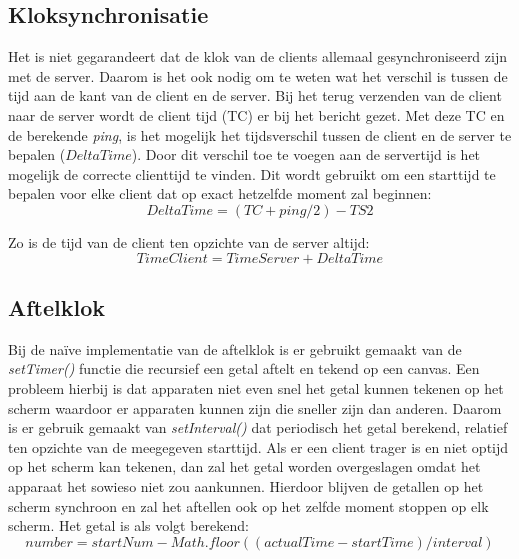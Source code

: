\subsection{Kloksynchronisatie}
Het is niet gegarandeert dat de klok van de clients allemaal gesynchroniseerd zijn met de server. Daarom is het ook nodig om te weten wat het verschil is tussen de tijd aan de kant van de client en de server.
Bij het terug verzenden van de client naar de server wordt de client tijd (TC) er bij het bericht gezet. Met deze TC en de berekende {\it ping}, is het mogelijk het tijdsverschil tussen de client en de server te bepalen ($DeltaTime$). Door dit verschil toe te voegen aan de servertijd is het mogelijk de correcte clienttijd te vinden. Dit wordt gebruikt om een starttijd te bepalen voor elke client dat op exact hetzelfde moment zal beginnen:
\[DeltaTime = (TC+ping/2) - TS2\]

Zo is de tijd van de client ten opzichte van de server altijd:
\[TimeClient = TimeServer + DeltaTime\]


\subsection{Aftelklok}
Bij de naïve implementatie van de aftelklok is er gebruikt gemaakt van de {\it setTimer()} functie die recursief een getal aftelt en tekend op een canvas. Een probleem hierbij is dat apparaten niet even snel het getal kunnen tekenen op het scherm waardoor er apparaten kunnen zijn die sneller zijn dan anderen.
Daarom is er gebruik gemaakt van {\it setInterval()} dat periodisch het getal berekend, relatief ten opzichte van de meegegeven starttijd. Als er een client trager is en niet optijd op het scherm kan tekenen, dan zal het getal worden overgeslagen omdat het apparaat het sowieso niet zou aankunnen. Hierdoor blijven de getallen op het scherm synchroon en zal het aftellen ook op het zelfde moment stoppen op elk scherm.
Het getal is als volgt berekend:
\[number = startNum - Math.floor((actualTime - startTime) / interval)\]


